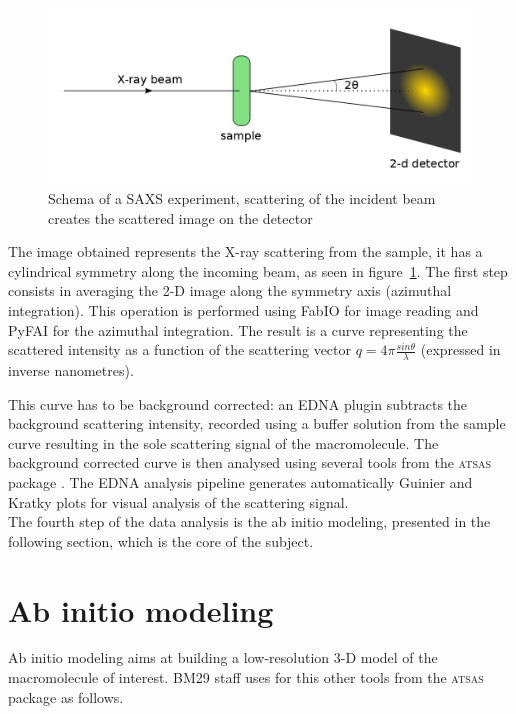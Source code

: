 \documentclass[a4paper, 11pt]{report}
\begin{document}
\begin{figure}
\centering
\includegraphics[scale=0.3]{schemaSAXS.png}
\caption{Schema of a SAXS experiment, scattering of the incident beam 
    creates the scattered image on the detector}
\label{fgr:schemaSAXS}
\end{figure}

The image obtained represents the X-ray scattering from the sample, it 
has a cylindrical symmetry along the incoming beam, as seen in 
figure~\ref{fgr:schemaSAXS}. 
The first step consists in averaging the 2-D image along the 
symmetry axis (azimuthal integration).  
This operation is performed using FabIO \cite{fabio} for image reading 
and PyFAI \cite{pyFAI} for the azimuthal integration. 
The result is a curve representing the scattered intensity as a 
function of the scattering vector $q = 4 \pi \frac{sin\theta}{\lambda}$ 
(expressed in inverse nanometres).

This curve has to be background corrected: an EDNA plugin subtracts the
background scattering intensity, recorded using a buffer
solution from the sample curve resulting in the sole scattering signal 
of the macromolecule. 
The background corrected curve is then analysed using several tools 
from the \textsc{atsas} package \cite{atsas}. 
The EDNA analysis pipeline generates automatically Guinier and Kratky
plots for visual analysis of the scattering signal.\\

The fourth step of the data analysis is the ab initio modeling, 
presented in the following section, which is the core of the subject.

\section{Ab initio modeling}
\label{modeling}                           %

Ab initio modeling aims at building a low-resolution 3-D model of the 
macromolecule of interest. 
BM29 staff uses for this other tools from the \textsc{atsas} package 
as follows.\\
\end{document}
